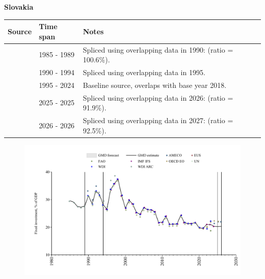 \documentclass[12pt,a4paper,landscape]{article}
\begin{document}
\begin{adjustbox}{max totalsize={\paperwidth}{\paperheight},center}
\begin{minipage}[t][\textheight][t]{\textwidth}
\vspace*{0.5cm}
{}
\begin{center}
{\Large\bfseries Slovakia}
\end{center}
\vspace{0.5cm}
\begin{table}[H]
\centering
\small
\begin{tabular}{|l|l|l|}
\hline
\textbf{Source} & \textbf{Time span} & \textbf{Notes} \\
\hline
\rowcolor{white}\cite{WDI_ARC}& 1985 - 1989 &Spliced using overlapping data in 1990: (ratio = 100.6\%).\\
\rowcolor{lightgray}\cite{WDI}& 1990 - 1994 &Spliced using overlapping data in 1995.\\
\rowcolor{white}\cite{EUS}& 1995 - 2024 &Baseline source, overlaps with base year 2018.\\
\rowcolor{lightgray}\cite{OECD_EO}& 2025 - 2025 &Spliced using overlapping data in 2026: (ratio = 91.9\%).\\
\rowcolor{white}\cite{AMECO}& 2026 - 2026 &Spliced using overlapping data in 2027: (ratio = 92.5\%).\\
\hline
\end{tabular}
\end{table}
\begin{figure}[H]
\centering
\includegraphics[width=\textwidth,height=0.6\textheight,keepaspectratio]{graphs/SVK_finv_GDP.pdf}
\end{figure}
\end{minipage}
\end{adjustbox}
\end{document}
